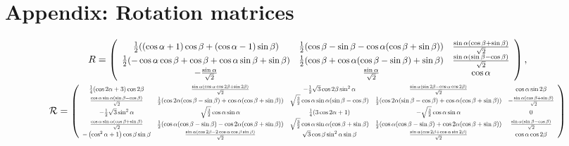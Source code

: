 \documentclass[a4paper,prb]{revtex4-1}  %
\newcommand\scalemath[2]{\scalebox{#1}{\mbox{\ensuremath{\displaystyle #2}}}}
\begin{document}
\section{Appendix: Rotation matrices}



\begin{gather}
\nonumber
R=
\left(
\scalemath{0.9}{
\begin{array}{ccc}
 \frac{1}{2} ((\cos \alpha+1) \cos \beta+(\cos \alpha-1) \sin \beta) & \frac{1}{2} (\cos \beta-\sin \beta-\cos \alpha (\cos \beta+\sin \beta)) & \frac{\sin \alpha (\cos \beta+\sin \beta)}{\sqrt{2}} \\
 \frac{1}{2} (-\cos \alpha \cos \beta+\cos \beta+\cos \alpha \sin \beta+\sin \beta) & \frac{1}{2} (\cos \beta+\cos \alpha (\cos \beta-\sin \beta)+\sin \beta) & \frac{\sin \alpha (\sin \beta-\cos \beta)}{\sqrt{2}} \\
 -\frac{\sin \alpha}{\sqrt{2}} & \frac{\sin \alpha}{\sqrt{2}} & \cos \alpha \\
\end{array}
}
\right),\\ \nonumber
\mathcal{R}=
\left(
\scalemath{0.65}{
\begin{array}{ccccc}
 \frac{1}{4} (\cos 2 \alpha+3) \cos 2 \beta & \frac{\sin \alpha (\cos \alpha \cos 2 \beta+\sin 2 \beta)}{\sqrt{2}} & -\frac{1}{2} \sqrt{3} \cos 2 \beta \sin ^2\alpha & \frac{\sin \alpha (\sin 2 \beta-\cos \alpha \cos 2 \beta)}{\sqrt{2}} & \cos \alpha \sin 2 \beta \\
 \frac{\cos \alpha \sin \alpha (\sin \beta-\cos \beta)}{\sqrt{2}} & \frac{1}{2} (\cos 2 \alpha (\cos \beta-\sin \beta)+\cos \alpha (\cos \beta+\sin \beta)) & \sqrt{\frac{3}{2}} \cos \alpha \sin \alpha (\sin \beta-\cos \beta) & \frac{1}{2} (\cos 2 \alpha (\sin \beta-\cos \beta)+\cos \alpha (\cos \beta+\sin \beta)) & -\frac{\sin \alpha (\cos \beta+\sin \beta)}{\sqrt{2}} \\
 -\frac{1}{2} \sqrt{3} \sin ^2\alpha & \sqrt{\frac{3}{2}} \cos \alpha \sin \alpha & \frac{1}{4} (3 \cos 2 \alpha+1) & -\sqrt{\frac{3}{2}} \cos \alpha \sin \alpha & 0 \\
 \frac{\cos \alpha \sin \alpha (\cos \beta+\sin \beta)}{\sqrt{2}} & \frac{1}{2} (\cos \alpha (\cos \beta-\sin \beta)-\cos 2 \alpha (\cos \beta+\sin \beta)) & \sqrt{\frac{3}{2}} \cos \alpha \sin \alpha (\cos \beta+\sin \beta) & \frac{1}{2} (\cos \alpha (\cos \beta-\sin \beta)+\cos 2 \alpha (\cos \beta+\sin \beta)) & \frac{\sin \alpha (\sin \beta-\cos \beta)}{\sqrt{2}} \\
 -\left(\cos ^2\alpha+1\right) \cos \beta \sin \beta & \frac{\sin \alpha (\cos 2 \beta-2 \cos \alpha \cos \beta \sin \beta)}{\sqrt{2}} & \sqrt{3} \cos \beta \sin ^2\alpha \sin \beta & \frac{\sin \alpha (\cos 2 \beta+\cos \alpha \sin 2 \beta)}{\sqrt{2}} & \cos \alpha \cos 2 \beta \\
\end{array}
}
\right)
\end{gather}
\end{document}
